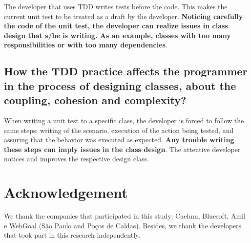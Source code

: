 \documentclass[times]{elsarticle}
\begin{document}
The developer that uses TDD writes tests before the code. This makes
the current unit test to be treated as a draft by the developer.
\textbf{Noticing carefully the code of the unit test, the developer can
realize issues in class design that s/he is writing. As an example,
classes with too many responsibilities or with too many dependencies}.

\subsection{How the TDD practice affects the programmer in the process of designing
classes, about the coupling, cohesion and complexity?}

When writing a unit test to a specific class, the developer is forced to follow
the same steps: writing of the scenario, execution of the action being
tested, and assuring that the behavior was executed as
expected.
\textbf{Any trouble writing these steps can imply issues in the class design}. 
The attentive developer notices and improves the respective design class.

\section*{Acknowledgement}

We thank the companies that participated in this study: Caelum, Bluesoft,
Amil e WebGoal (São Paulo and Poços de Caldas). Besides, we thank the
developers that took part in this research independently.
\end{document}
